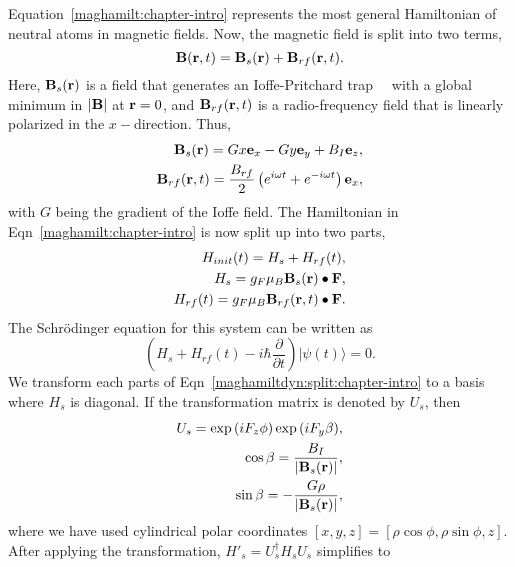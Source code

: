 Equation~\ref{maghamilt:chapter-intro} represents the most general Hamiltonian of neutral atoms in magnetic fields. Now, the magnetic field is split into two terms,
\begin{equation}
{\bf B}({\bf r},t) =  {\bf B}_s({\bf r}) + {\bf B}_{rf}({\bf r},t).
\end{equation}
Here, ${\bf B}_s({\bf r})$ is a field that generates an Ioffe-Pritchard trap~\cite{pethick:bec}~\cite{Pritchard:trapgradients} with a global minimum in $|{\bf B}|$ at ${\bf r}=0$, and ${\bf B}_{rf}({\bf r},t)$ is a radio-frequency field that is linearly polarized in the $x-$direction. Thus,
\begin{eqnarray}
  {\bf B}_s({\bf r}) = Gx {\bf e}_x   -Gy {\bf e}_y   +B_I{\bf e}_z, \nonumber \\ 
 {\bf B}_{rf}({\bf r},t) = \frac{B_{rf}}{2}\left( e^{i\omega t}+ e^{-i\omega t} \right) {\bf e}_x,
 \label{eq:magfields:chapter-intro}
\end{eqnarray}
with $G$ being the gradient of the Ioffe field. The Hamiltonian in Eqn~\ref{maghamilt:chapter-intro} is now split up into two parts,
\begin{eqnarray}
H_{init}(t) = H_s + H_{rf}(t), \nonumber \\
H_s =  g_F \mu_B {\bf B}_s({\bf r}) \bullet {\bf F}, \nonumber \\
H_{rf}(t) = g_F \mu_B {\bf B}_{rf}({\bf r},t) \bullet {\bf F}.
\label{maghamilt:split:chapter-intro}
\end{eqnarray}
The Schr\"odinger equation for this system can be written as 
\begin{equation}
\left( H_s + H_{rf}(t) - i\hbar \frac{\partial}{\partial t} \right) |\psi(t)\rangle = 0.
\label{maghamiltdyn:split:chapter-intro}
\end{equation}
We transform each parts of Eqn~\ref{maghamiltdyn:split:chapter-intro} to a basis where $H_s$ is diagonal. If the transformation matrix is denoted by $U_s$, then
\begin{eqnarray}
U_s = \exp{\left( iF_z \phi \right)}\exp{\left( iF_y\beta\right)}, \nonumber \\
\cos{\beta} = \frac{B_I}{|{\bf B}_s({\bf r})|}, \nonumber \\
\sin{\beta} = - \frac{G\rho}{|{\bf B}_s({\bf r})|},
\label{eq:beta:chapter-intro}
\end{eqnarray}
where we have used cylindrical polar coordinates $\left[ x, y, z \right]=\left[ \rho \cos{\phi}, \rho \sin{\phi}, z \right]$. After applying the transformation, $H'_s=U^\dagger_s H_s U_s$ simplifies to 
